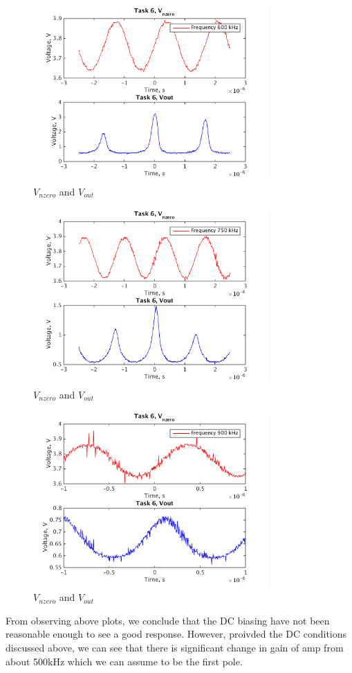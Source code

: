 \documentclass[a4paper,english,11pt]{article}
\begin{document}
\begin{figure}[H]
 \centering
  \includegraphics[width=0.8\textwidth]{img/task6_b_3.png}
  \caption{ $V_{nzero}$ and  $V_{out}$}
  \label{freq3}	
\end{figure}

\begin{figure}[H]
 \centering
  \includegraphics[width=0.8\textwidth]{img/task6_b_4.png}
  \caption{ $V_{nzero}$ and  $V_{out}$}
  \label{freq4}	
\end{figure}

\begin{figure}[H]
 \centering
  \includegraphics[width=0.8\textwidth]{img/task6_b_5.png}
  \caption{ $V_{nzero}$ and  $V_{out}$}
  \label{freq5}	
\end{figure}

From observing above plots, we conclude that the DC biasing have not been reasonable enough to see a good response. However, proivded the DC conditions discussed above, we can see that there is significant change in gain of amp from about 500kHz which we can assume to be the first pole. 
\end{document}

